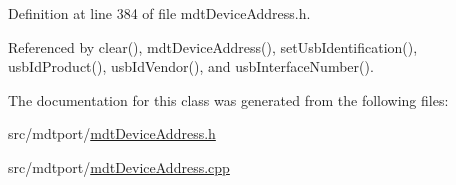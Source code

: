 Definition at line 384 of file mdt\-Device\-Address.\-h.



Referenced by clear(), mdt\-Device\-Address(), set\-Usb\-Identification(), usb\-Id\-Product(), usb\-Id\-Vendor(), and usb\-Interface\-Number().



The documentation for this class was generated from the following files\-:\begin{DoxyCompactItemize}
\item 
src/mdtport/\hyperlink{mdt_device_address_8h}{mdt\-Device\-Address.\-h}\item 
src/mdtport/\hyperlink{mdt_device_address_8cpp}{mdt\-Device\-Address.\-cpp}\end{DoxyCompactItemize}
